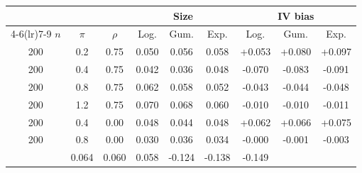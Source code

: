\begin{tabular}{ccc ccc ccc}
\toprule
 & & & \multicolumn{3}{c}{Size} & \multicolumn{3}{c}{IV bias} \\
\cmidrule(lr){4-6}\cmidrule(lr){7-9}
$n$ & $\pi$ & $\rho$ & Log. & Gum. & Exp. & Log. & Gum. & Exp. \\
\midrule
200 & 0.2 & 0.75 & 0.050 & 0.056 & 0.058 & +0.053 & +0.080 & +0.097 \\
200 & 0.4 & 0.75 & 0.042 & 0.036 & 0.048 & -0.070 & -0.083 & -0.091 \\
200 & 0.8 & 0.75 & 0.062 & 0.058 & 0.052 & -0.043 & -0.044 & -0.048 \\
200 & 1.2 & 0.75 & 0.070 & 0.068 & 0.060 & -0.010 & -0.010 & -0.011 \\
200 & 0.4 & 0.00 & 0.048 & 0.044 & 0.048 & +0.062 & +0.066 & +0.075 \\
200 & 0.8 & 0.00 & 0.030 & 0.036 & 0.034 & -0.000 & -0.001 & -0.003 \\
\addlinespace
\multicolumn{3}{l}{15\% censoring} & 0.064 & 0.060 & 0.058 & -0.124 & -0.138 & -0.149 \\
\bottomrule
\end{tabular}
